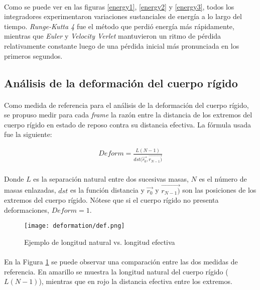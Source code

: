 \documentclass[12pt, twocolumn]{article}
\begin{document}
	\paragraph{} Como se puede ver en las figuras \ref{energy1}, \ref{energy2} y \ref{energy3}, todos los integradores experimentaron variaciones sustanciales de energía a lo largo del tiempo. \textit{Runge-Kutta 4} fue el método que perdió energía más rápidamente, mientras que \textit{Euler} y \textit{Velocity Verlet} mantuvieron un ritmo de pérdida relativamente constante luego de una pérdida inicial más pronunciada en los primeros segundos.
	
	\subsection{Análisis de la deformación del cuerpo rígido}
	
	\paragraph{} Como medida de referencia para el análisis de la deformación del cuerpo rígido, se propuso medir para cada \textit{frame} la razón entre la distancia de los extremos del cuerpo rígido en estado de reposo contra su distancia efectiva. La fórmula usada fue la siguiente:
	
	\begin{align}
	   Deform = \frac{L(N-1)}{dst(\Vec{r_{0}}, \Vec{r_{N-1})}}
	\end{align}
	
	\paragraph{} Donde $L$ es la separación natural entre dos sucesivas masas, $N$ es el número de masas enlazadas, $dst$ es la función distancia y $\Vec{r_{0}}$ y $\Vec{r_{N-1})}$ son las posiciones de los extremos del cuerpo rígido. Nótese que si el cuerpo rígido no presenta deformaciones, $Deform = 1$.
	
    \begin{figure}[H]
		\centering
		\texttt{[image: deformation/def.png]}
		\caption{Ejemplo de longitud natural vs. longitud efectiva}
		\label{natvsefec}
	\end{figure}
	
	\paragraph{} En la Figura \ref{natvsefec} se puede observar una comparación entre las dos medidas de referencia. En amarillo se muestra la longitud natural del cuerpo rígido ($L(N-1)$), mientras que en rojo la distancia efectiva entre los extremos.
	
\end{document}

